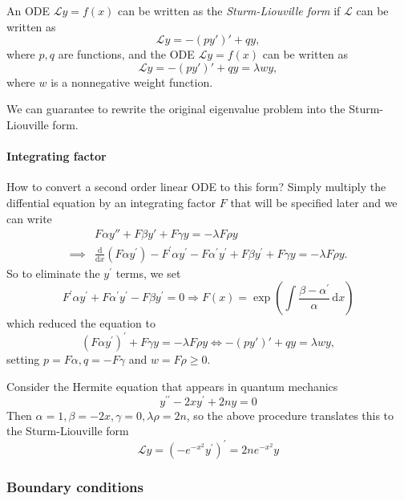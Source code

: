 \documentclass[a4paper]{article}
\begin{document}
\begin{definition}
    An ODE $ \mathcal{L}y=f(x) $ can be written as the \textit{Sturm-Liouville form} if $ \mathcal{L} $ can be written as
    \[
        \mathcal{L}y=-(py')'+qy,
    \]
    where $ p,q$ are functions, and the ODE $ \mathcal{L}y=f(x) $ can be written as 
    \begin{equation}
        \mathcal{L}y=-(py')'+qy=\lambda w y,
    \end{equation}
    where $w$ is a nonnegative weight function.
\end{definition}

We can guarantee to rewrite the original eigenvalue problem into the Sturm-Liouville form.

\paragraph{Integrating factor} How to convert a second order linear ODE to this form?
Simply multiply the diffential equation by an integrating factor $F$ that will be specified later and we can write
\begin{align*}
    &F \alpha y''+F \beta y'+ F \gamma y = -\lambda F \rho y\\ 
    \implies&\frac{\mathrm d}{\mathrm dx}(F\alpha y^\prime)-F^\prime\alpha y^\prime-F\alpha^\prime y^\prime+F\beta y^\prime+F\gamma y=-\lambda F\rho y.
\end{align*}
So to eliminate the $y^\prime$ terms, we set
\begin{equation}
    F^\prime\alpha y^\prime+F\alpha^\prime y^\prime-F\beta y^\prime=0 \Longrightarrow  F(x)=\exp\left(\int\frac{\beta-\alpha^\prime}{\alpha}\,\mathrm dx\right)
\end{equation}
which reduced the equation to
$$(F\alpha y^\prime)^\prime+F\gamma y=-\lambda F\rho y \Longleftrightarrow -(py')'+qy=\lambda w y,$$
setting $p=F\alpha,q=-F\gamma$ and $w=F\rho\ge 0$.
\begin{example}
    Consider the Hermite equation that appears in quantum mechanics
    $$y^{\prime\prime}-2xy^\prime+2ny=0$$
    Then $\alpha=1,\beta=-2x,\gamma=0,\lambda\rho=2n$, so the above procedure translates this to the Sturm-Liouville form
    \begin{equation}\label{2.eq.9}
        \mathcal Ly=(-e^{-x^2}y^\prime)^\prime=2ne^{-x^2}y
    \end{equation}
\end{example}
\subsubsection*{Boundary conditions}
\end{document}
